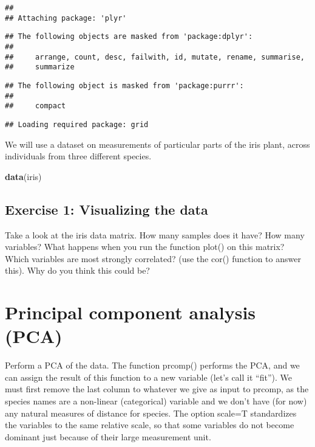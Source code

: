 \documentclass[
]{book}
\newenvironment{Shaded}{\begin{snugshade}}{\end{snugshade}}
\newcommand{\KeywordTok}[1]{\textcolor[rgb]{0.13,0.29,0.53}{\textbf{#1}}}
\newcommand{\NormalTok}[1]{#1}
\begin{document}
\begin{verbatim}
## 
## Attaching package: 'plyr'
\end{verbatim}

\begin{verbatim}
## The following objects are masked from 'package:dplyr':
## 
##     arrange, count, desc, failwith, id, mutate, rename, summarise,
##     summarize
\end{verbatim}

\begin{verbatim}
## The following object is masked from 'package:purrr':
## 
##     compact
\end{verbatim}

\begin{verbatim}
## Loading required package: grid
\end{verbatim}

We will use a dataset on measurements of particular parts of the iris plant, across individuals from three different species.

\begin{Shaded}
\begin{Highlighting}[]
\KeywordTok{data}\NormalTok{(iris)}
\end{Highlighting}
\end{Shaded}

\hypertarget{exercise-1-visualizing-the-data}{%
\subsection{Exercise 1: Visualizing the data}\label{exercise-1-visualizing-the-data}}

Take a look at the iris data matrix. How many samples does it have? How many variables? What happens when you run the function plot() on this matrix? Which variables are most strongly correlated? (use the cor() function to answer this). Why do you think this could be?

\hypertarget{principal-component-analysis-pca}{%
\section{Principal component analysis (PCA)}\label{principal-component-analysis-pca}}

Perform a PCA of the data. The function prcomp() performs the PCA, and we can assign the result of this function to a new variable (let's call it ``fit''). We must first remove the last column to whatever we give as input to prcomp, as the species names are a non-linear (categorical) variable and we don't have (for now) any natural measures of distance for species. The option scale=T standardizes the variables to the same relative scale, so that some variables do not become dominant just because of their large measurement unit.
\end{document}
